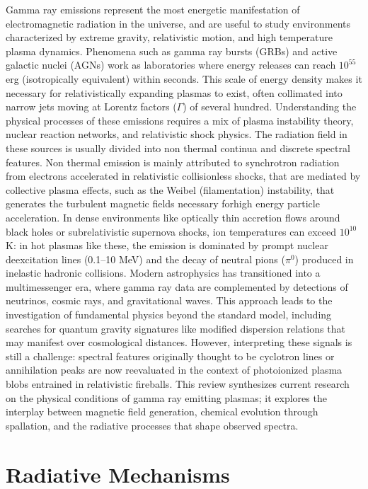 \documentclass{aa} %
\begin{document}
Gamma ray emissions represent the most energetic manifestation of electromagnetic radiation in the universe, and are useful to study environments characterized by extreme gravity, relativistic motion, and high temperature plasma dynamics. Phenomena such as gamma ray bursts (GRBs) and active galactic nuclei (AGNs) work as laboratories where energy releases can reach $10^{55}$ erg (isotropically equivalent) within seconds. This scale of energy density makes it necessary for relativistically expanding plasmas to exist, often collimated into narrow jets moving at Lorentz factors ($\Gamma$) of several hundred. Understanding the physical processes of these emissions requires a mix of plasma instability theory, nuclear reaction networks, and relativistic shock physics. 
The radiation field in these sources is usually divided into non thermal continua and discrete spectral features. Non thermal emission is mainly attributed to synchrotron radiation from electrons accelerated in relativistic collisionless shocks, that are mediated by collective plasma effects, such as the Weibel (filamentation) instability, that generates the turbulent magnetic fields necessary forhigh energy particle acceleration. In dense environments like optically thin accretion flows around black holes or subrelativistic supernova shocks, ion temperatures can exceed $10^{10}$ K: in hot plasmas like these, the emission is dominated by prompt nuclear deexcitation lines (0.1–10 MeV) and the decay of neutral pions ($\pi^0$) produced in inelastic hadronic collisions. 
Modern astrophysics has transitioned into a multimessenger era, where gamma ray data are complemented by detections of neutrinos, cosmic rays, and gravitational waves. This approach leads to the investigation of fundamental physics beyond the standard model, including searches for quantum gravity signatures like modified dispersion relations that may manifest over cosmological distances. However, interpreting these signals is still a challenge: spectral features originally thought to be cyclotron lines or annihilation peaks are now reevaluated in the context of photoionized plasma blobs entrained in relativistic fireballs. 
This review synthesizes current research on the physical conditions of gamma ray emitting plasmas; it explores the interplay between magnetic field generation, chemical evolution through spallation, and the radiative processes that shape observed spectra.

\section{Radiative Mechanisms}
\end{document}
